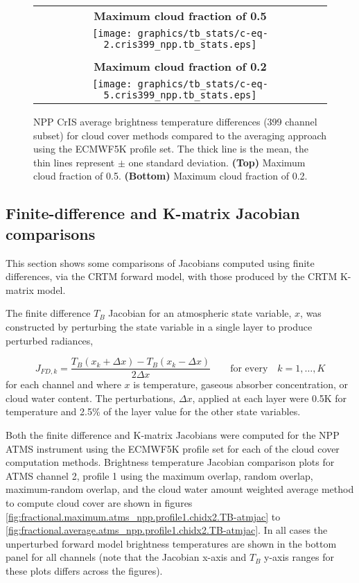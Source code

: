\begin{figure}[H]
  \caption{NPP CrIS average brightness temperature differences (399 channel subset) for cloud cover methods compared to the averaging approach using the ECMWF5K profile set. The thick line is the mean, the thin lines represent $\pm$ one standard deviation. \textbf{(Top)} Maximum cloud fraction of 0.5. \textbf{(Bottom)} Maximum cloud fraction of 0.2. }
  \label{fig:cris399_npp.tb_stats}
  \centering
  \begin{tabular}{c}
    \\
    \sffamily\textbf{Maximum cloud fraction of 0.5} \\
    \texttt{[image: graphics/tb\_stats/c-eq-2.cris399\_npp.tb\_stats.eps]} \\\\
    \sffamily\textbf{Maximum cloud fraction of 0.2} \\
    \texttt{[image: graphics/tb\_stats/c-eq-5.cris399\_npp.tb\_stats.eps]}
  \end{tabular}
\end{figure}


\subsection{Finite-difference and K-matrix Jacobian comparisons}
\label{sec:fd_vs_km}

This section shows some comparisons of Jacobians computed using finite differences, via the CRTM forward model, with those produced by the CRTM K-matrix model.

The finite difference $T_B$ Jacobian for an atmospheric state variable, $x$, was constructed by perturbing the state variable in a single layer to produce perturbed radiances,

\begin{equation}
  J_{FD,k} = \frac{T_B(x_k + \Delta x) - T_B(x_k - \Delta x)}{2\Delta x}\qquad\mbox{for every}\quad k = 1,\ldots,K
  \label{eqn:fd_jacobian}
\end{equation}
for each channel and where $x$ is temperature, gaseous absorber concentration, or cloud water content. The perturbations, $\Delta x$, applied at each layer were 0.5K for temperature and 2.5\% of the layer value for the other state variables.

Both the finite difference and K-matrix Jacobians were computed for the NPP ATMS instrument using the ECMWF5K profile set for each of the cloud cover computation methods. Brightness temperature Jacobian comparison plots for ATMS channel 2, profile 1 using the maximum overlap, random overlap, maximum-random overlap, and the cloud water amount weighted average method \citep{Geer_2009} to compute cloud cover are shown in figures \ref{fig:fractional.maximum.atms_npp.profile1.chidx2.TB-atmjac} to \ref{fig:fractional.average.atms_npp.profile1.chidx2.TB-atmjac}. In all cases the unperturbed forward model brightness temperatures are shown in the bottom panel for all channels (note that the Jacobian x-axis and $T_B$ y-axis ranges for these plots differs across the figures).

